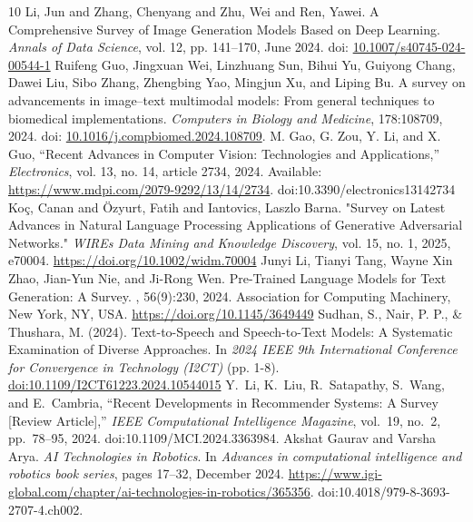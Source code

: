 \documentclass{article}
\begin{document}
\begin{thebibliography}{10}
  Li, Jun and Zhang, Chenyang and Zhu, Wei and Ren, Yawei.
  A Comprehensive Survey of Image Generation Models Based on Deep Learning.
  \textit{Annals of Data Science}, vol. 12, pp. 141--170, June 2024.
  doi: \href{https://doi.org/10.1007/s40745-024-00544-1}{10.1007/s40745-024-00544-1}
Ruifeng Guo, Jingxuan Wei, Linzhuang Sun, Bihui Yu, Guiyong Chang, Dawei Liu, Sibo Zhang, Zhengbing Yao, Mingjun Xu, and Liping Bu.
A survey on advancements in image--text multimodal models: From general techniques to biomedical implementations.
\textit{Computers in Biology and Medicine}, 178:108709, 2024.
doi: \href{https://doi.org/10.1016/j.compbiomed.2024.108709}{10.1016/j.compbiomed.2024.108709}.
M. Gao, G. Zou, Y. Li, and X. Guo, ``Recent Advances in Computer Vision: Technologies and Applications,'' \emph{Electronics}, vol. 13, no. 14, article 2734, 2024. Available: \url{https://www.mdpi.com/2079-9292/13/14/2734}. doi:10.3390/electronics13142734
Koç, Canan and Özyurt, Fatih and Iantovics, Laszlo Barna.
"Survey on Latest Advances in Natural Language Processing Applications of Generative Adversarial Networks."
\textit{WIREs Data Mining and Knowledge Discovery}, vol. 15, no. 1, 2025, e70004.
\href{https://doi.org/10.1002/widm.70004}{https://doi.org/10.1002/widm.70004}
Junyi Li, Tianyi Tang, Wayne Xin Zhao, Jian-Yun Nie, and Ji-Rong Wen.
\newblock Pre-Trained Language Models for Text Generation: A Survey.
, 56(9):230, 2024.
\newblock Association for Computing Machinery, New York, NY, USA.
\newblock \url{https://doi.org/10.1145/3649449}
Sudhan, S., Nair, P. P., \& Thushara, M. (2024). Text-to-Speech and Speech-to-Text Models: A Systematic Examination of Diverse Approaches. In \textit{2024 IEEE 9th International Conference for Convergence in Technology (I2CT)} (pp. 1-8). \href{https://doi.org/10.1109/I2CT61223.2024.10544015}{doi:10.1109/I2CT61223.2024.10544015}
Y.~Li, K.~Liu, R.~Satapathy, S.~Wang, and E.~Cambria,
``Recent Developments in Recommender Systems: A Survey [Review Article],'' 
\emph{IEEE Computational Intelligence Magazine}, vol.~19, no.~2, pp.~78--95, 2024. doi:10.1109/MCI.2024.3363984.
Akshat Gaurav and Varsha Arya.
\newblock \emph{AI Technologies in Robotics}.
\newblock In \emph{Advances in computational intelligence and robotics book series}, pages 17--32, December 2024.
\newblock \href{https://www.igi-global.com/chapter/ai-technologies-in-robotics/365356}{https://www.igi-global.com/chapter/ai-technologies-in-robotics/365356}.
\newblock doi:10.4018/979-8-3693-2707-4.ch002.

\end{thebibliography}
\end{document}
